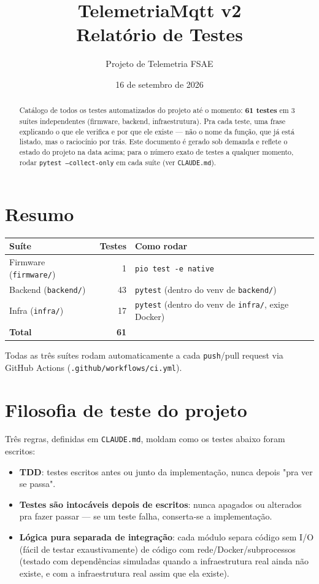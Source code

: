 \documentclass[10pt,a4paper]{article}
\title{\textbf{TelemetriaMqtt v2} \\[4pt]
\large Relatório de Testes}
\author{Projeto de Telemetria FSAE}
\date{16 de setembro de 2026}
\begin{document}
\maketitle

\begin{abstract}
\noindent Catálogo de todos os testes automatizados do projeto até o momento: \textbf{61 testes} em 3 suítes independentes (firmware, backend, infraestrutura). Pra cada teste, uma frase explicando o que ele verifica e por que ele existe — não o nome da função, que já está listado, mas o raciocínio por trás. Este documento é gerado sob demanda e reflete o estado do projeto na data acima; para o número exato de testes a qualquer momento, rodar \texttt{pytest --collect-only} em cada suíte (ver \texttt{CLAUDE.md}).
\end{abstract}

\tableofcontents

\section{Resumo}

\begin{center}
\begin{tabular}{@{}lrl@{}}
\toprule
\textbf{Suíte} & \textbf{Testes} & \textbf{Como rodar} \\
\midrule
Firmware (\texttt{firmware/}) & 1 & \texttt{pio test -e native} \\
Backend (\texttt{backend/}) & 43 & \texttt{pytest} (dentro do venv de \texttt{backend/}) \\
Infra (\texttt{infra/}) & 17 & \texttt{pytest} (dentro do venv de \texttt{infra/}, exige Docker) \\
\midrule
\textbf{Total} & \textbf{61} & \\
\bottomrule
\end{tabular}
\end{center}

Todas as três suítes rodam automaticamente a cada \texttt{push}/pull request via GitHub Actions (\texttt{.github/workflows/ci.yml}).

\section{Filosofia de teste do projeto}

Três regras, definidas em \texttt{CLAUDE.md}, moldam como os testes abaixo foram escritos:

\begin{itemize}
    \item \textbf{TDD}: testes escritos antes ou junto da implementação, nunca depois "pra ver se passa".
    \item \textbf{Testes são intocáveis depois de escritos}: nunca apagados ou alterados pra fazer passar — se um teste falha, conserta-se a implementação.
    \item \textbf{Lógica pura separada de integração}: cada módulo separa código sem I/O (fácil de testar exaustivamente) de código com rede/Docker/subprocessos (testado com dependências simuladas quando a infraestrutura real ainda não existe, e com a infraestrutura real assim que ela existe).
\end{itemize}
\end{document}
